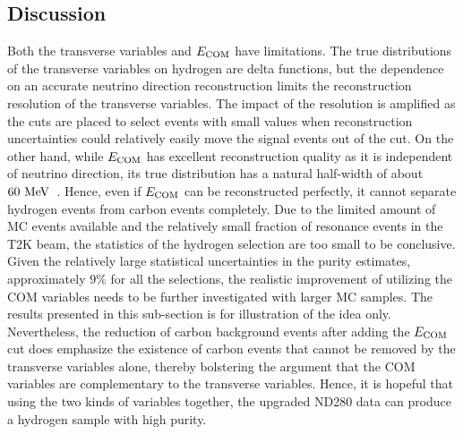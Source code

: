      \subsection{Discussion}
     Both the transverse variables and $E_{\textrm{COM}}$ have limitations.
     The true distributions of the transverse variables on hydrogen are delta functions, but the dependence on an accurate neutrino direction reconstruction limits the reconstruction resolution of the transverse variables.
     The impact of the resolution is amplified as the cuts are placed to select events with small values when reconstruction uncertainties could relatively easily move the signal events out of the cut.
     On the other hand, while $E_{\textrm{COM}}$ has excellent reconstruction quality as it is independent of neutrino direction, its true distribution has a natural half-width of about $60~\textrm{MeV}$~\cite{ParticleDataGroup:2024cfk}.
     Hence, even if $E_{\textrm{COM}}$ can be reconstructed perfectly, it cannot separate hydrogen events from carbon events completely.
     Due to the limited amount of MC events available and the relatively small fraction of resonance events in the T2K beam, the statistics of the hydrogen selection are too small to be conclusive.
     Given the relatively large statistical uncertainties in the purity estimates, approximately $9\%$ for all the selections, the realistic improvement of utilizing the COM variables needs to be further investigated with larger MC samples.
     The results presented in this sub-section is for illustration of the idea only.
     Nevertheless, the reduction of carbon background events after adding the $E_{\textrm{COM}}$ cut does emphasize the existence of carbon events that cannot be removed by the transverse variables alone, thereby bolstering the argument that the COM variables are complementary to the transverse variables.
     Hence, it is hopeful that using the two kinds of variables together, the upgraded ND280 data can produce a hydrogen sample with high purity.